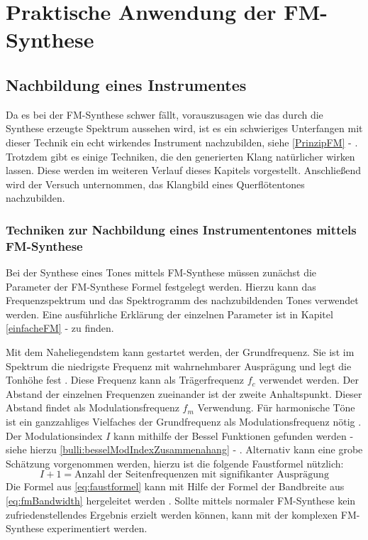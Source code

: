 \section{Praktische Anwendung der FM-Synthese}
\FloatBarrier
\subsection{Nachbildung eines Instrumentes}
Da es bei der FM-Synthese schwer fällt, vorauszusagen wie das durch die Synthese erzeugte Spektrum aussehen wird, ist es ein schwieriges Unterfangen mit dieser Technik ein echt wirkendes Instrument nachzubilden, siehe \ref{PrinzipFM} - .
Trotzdem gibt es einige Techniken, die den generierten Klang natürlicher wirken lassen. Diese werden im weiteren Verlauf dieses Kapitels vorgestellt. Anschließend wird der Versuch unternommen, das Klangbild eines Querflötentones nachzubilden.

\FloatBarrier
\subsubsection{Techniken zur Nachbildung eines Instrumententones mittels FM-Synthese}

Bei der Synthese eines Tones mittels FM-Synthese müssen zunächst die Parameter der FM-Synthese Formel festgelegt werden. Hierzu kann das Frequenzspektrum und das Spektrogramm des nachzubildenden Tones verwendet werden. Eine ausführliche Erklärung der einzelnen Parameter ist in Kapitel \ref{einfacheFM} -  zu finden. 

Mit dem Naheliegendstem kann gestartet werden, der Grundfrequenz. Sie ist im Spektrum die niedrigste Frequenz mit wahrnehmbarer Ausprägung und legt die Tonhöhe fest \cite[S. 53]{barkowsky}. Diese Frequenz kann als Trägerfrequenz $f_c$ verwendet werden. Der Abstand der einzelnen Frequenzen zueinander ist der zweite Anhaltspunkt. Dieser Abstand findet als Modulationsfrequenz $f_m$ Verwendung. Für harmonische Töne ist ein ganzzahliges Vielfaches der Grundfrequenz als Modulationsfrequenz nötig \cite[S. 528]{chowningPaper}. Der Modulationsindex $I$ kann mithilfe der Bessel Funktionen gefunden werden - siehe hierzu \ref{bulli:besselModIndexZusammenahang} - . Alternativ kann eine grobe Schätzung vorgenommen werden, hierzu ist die folgende Faustformel nützlich:
\begin{equation}
\label{eq:faustformel}
I + 1 = \text{Anzahl der Seitenfrequenzen mit signifikanter Ausprägung}
\end{equation}
Die Formel aus \ref{eq:faustformel} kann mit Hilfe der Formel der Bandbreite aus \ref{eq:fmBandwidth} hergeleitet werden \cite[S. 221]{lathi}. Sollte mittels normaler FM-Synthese kein zufriedenstellendes Ergebnis erzielt werden können, kann mit der komplexen FM-Synthese experimentiert werden. 

